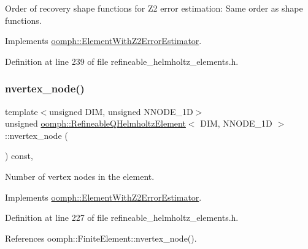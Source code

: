 Order of recovery shape functions for Z2 error estimation\+: Same order as shape functions. 



Implements \hyperlink{classoomph_1_1ElementWithZ2ErrorEstimator_af39480835bd3e0f6b2f4f7a9a4044798}{oomph\+::\+Element\+With\+Z2\+Error\+Estimator}.



Definition at line 239 of file refineable\+\_\+helmholtz\+\_\+elements.\+h.

\mbox{\label{classoomph_1_1RefineableQHelmholtzElement_aef66f141dff057f7ceb589d5e1142292}} 
\subsubsection{\texorpdfstring{nvertex\+\_\+node()}{nvertex\_node()}}
{\footnotesize\ttfamily template$<$unsigned D\+IM, unsigned N\+N\+O\+D\+E\+\_\+1D$>$ \\
unsigned \hyperlink{classoomph_1_1RefineableQHelmholtzElement}{oomph\+::\+Refineable\+Q\+Helmholtz\+Element}$<$ D\+IM, N\+N\+O\+D\+E\+\_\+1D $>$\+::nvertex\+\_\+node (\begin{DoxyParamCaption}{ }\end{DoxyParamCaption}) const\hspace{0.3cm}{\ttfamily [inline]}, {\ttfamily [virtual]}}



Number of vertex nodes in the element. 



Implements \hyperlink{classoomph_1_1ElementWithZ2ErrorEstimator_a19495a0e77ef4ff35f15fdf7913b4077}{oomph\+::\+Element\+With\+Z2\+Error\+Estimator}.



Definition at line 227 of file refineable\+\_\+helmholtz\+\_\+elements.\+h.



References oomph\+::\+Finite\+Element\+::nvertex\+\_\+node().

\mbox{\label{classoomph_1_1RefineableQHelmholtzElement_a962ab14f0f212d41772775fb8bb73c1a}} 
